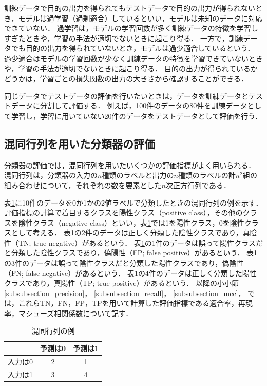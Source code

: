 \documentclass[12pt,a4j,dvipdfmx]{jreport}
\begin{document}
訓練データで目的の出力を得られてもテストデータで目的の出力が得られないとき，モデルは過学習（過剰適合）しているといい，モデルは未知のデータに対応できていない．
過学習は，モデルの学習回数が多く訓練データの特徴を学習しすぎたときや，学習の手法が適切でないときに起こり得る．
一方で，訓練データでも目的の出力を得られていないとき，モデルは過少適合しているという．
過少適合はモデルの学習回数が少なく訓練データの特徴を学習できていないときや，学習の手法が適切でないときに起こり得る．
目的の出力が得られているかどうかは，学習ごとの損失関数の出力の大きさから確認することができる．

同じデータでテストデータの評価を行いたいときは，データを訓練データとテストデータに分割して評価する．
例えば，100件のデータの80件を訓練データとして学習し，学習に用いていない20件のデータをテストデータとして評価を行う．


\subsection{混同行列を用いた分類器の評価}
分類器の評価では，混同行列を用いたいくつかの評価指標がよく用いられる\cite{aurellen20}．
混同行列は，分類器の入力の$n$種類のラベルと出力の$n$種類のラベルの計$n^2$組の組み合わせについて，それぞれの数を要素とした$n$次正方行列である．

\newpage

表\ref{confusion_matrix}に10件のデータを0か1かの2値ラベルで分類したときの混同行列の例を示す．
評価指標の計算で着目するクラスを陽性クラス（positive class），その他のクラスを陰性クラス（negative class）といい，表\ref{confusion_matrix}では1を陽性クラス，0を陰性クラスとして考える．
表\ref{confusion_matrix}の2件のデータは正しく分類した陰性クラスであり，真陰性（TN; true negative）があるという．
表\ref{confusion_matrix}の1件のデータは誤って陽性クラスだと分類した陰性クラスであり，偽陽性（FP; false positive）があるという．
表\ref{confusion_matrix}の3件のデータは誤って陰性クラスだと分類した陽性クラスであり，偽陰性（FN; false negative）があるという．
表\ref{confusion_matrix}の4件のデータは正しく分類した陽性クラスであり，真陽性（TP; true positive）があるという．
以降の小小節
\ref{subsubsection_precision}，
\ref{subsubsection_recall}，
\ref{subsubsection_mcc}，
では，これらTN，FN，FP，TPを用いて計算した評価指標である適合率，再現率，マシューズ相関係数について記す．

\begin{table}[H]
  \caption{
    混同行列の例
    }
  \vspace{3mm}
  \centering
    \begin{tabular}{c|cc}
     & 予測は0 & 予測は1 \\
    \hline
    入力は0 & 2 & 1 \\
    入力は1 & 3 & 4
  \end{tabular}
  \label{confusion_matrix}
\end{table}
\end{document}
